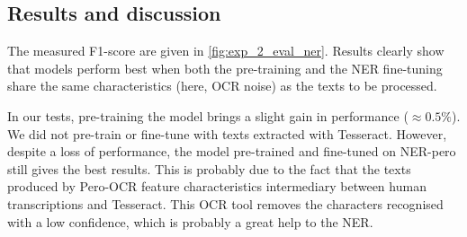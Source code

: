 



\subsection{Results and discussion}
The measured F1-score are given in \cref{fig:exp_2_eval_ner}.
Results clearly show that models perform best when both the pre-training and the NER fine-tuning share the same characteristics (here, OCR noise) as the texts to be processed.

In our tests, pre-training the model brings a slight gain in performance ($\approx 0.5\%$).
We did not pre-train or fine-tune with texts extracted with Tesseract.
However, despite a loss of performance, the model pre-trained and fine-tuned on NER-pero still gives the best results.
This is probably due to the fact that the texts produced by Pero-OCR feature characteristics intermediary between human transcriptions and Tesseract.
This OCR tool removes the characters recognised with a low confidence, which is probably a great help to the NER.

